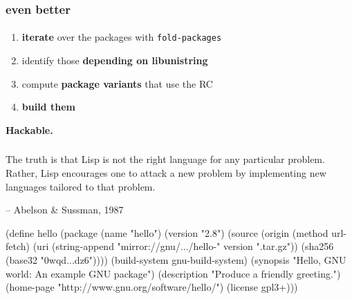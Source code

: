 \documentclass{beamer}
\begin{document}
\begin{frame}
  \frametitle{\huge{even better}}
  \framesubtitle{}

  \Large{
    \begin{enumerate}
    \item \textbf{iterate} over the packages with \texttt{fold-packages}
    \item identify those \textbf{depending on libunistring}
    \item compute \textbf{package variants} that use the RC
    \item \textbf{build them}
    \end{enumerate}
  }
\end{frame}


\begin{frame}[plain]
  \begin{centering}
    \Huge{\textbf{Hackable.}}
  \end{centering}
\end{frame}

\begin{frame}[plain]
  \frametitle{}
  
  \vspace{0.5cm}
  \textrm{\LARGE{%
      The truth is that Lisp is not the right language for
      any particular problem.  Rather, Lisp encourages one to attack a
      new problem by \alert{implementing new languages} tailored to that
      problem.  }}

  \vspace{1cm}
  \hfill{-- Abelson \& Sussman, 1987}
\end{frame}

\begin{frame}[fragile]
  \begin{semiverbatim}
(define hello
  (\alert{package}
   (name "hello")
   (version "2.8")
   (source (\alert{origin}
            (method url-fetch)
            (uri (string-append
                  "mirror://gnu/\textrm{...}/hello-" version
                  ".tar.gz"))
            (sha256 (base32 "0wqd\textrm{...}dz6"))))
   (\alert{build-system} gnu-build-system)
   (synopsis "Hello, GNU world: An example GNU package")
   (description "Produce a friendly greeting.")
   (home-page "http://www.gnu.org/software/hello/")
   (license gpl3+)))
  \end{semiverbatim}

\end{frame}
\end{document}
